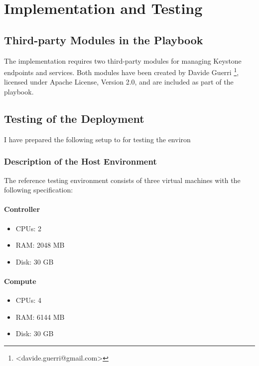 \chapter{Implementation and Testing}
\label{ch:testing}


\section{Third-party Modules in the Playbook}

The implementation requires two third-party modules for managing Keystone endpoints and services. Both modules have been created by Davide Guerri \footnote{<davide.guerri@gmail.com>}, licensed under Apache License, Version 2.0, and are included as part of the playbook.

\section{Testing of the Deployment}

I have prepared the following setup to for testing the environ
\subsection{Description of the Host Environment}

The reference testing environment consists of three virtual machines with the following specification:

\subsubsection*{Controller}

\begin{itemize}
  \item{CPUs: 2}
  \item{RAM: 2048 MB}
  \item{Disk: 30 GB}
\end{itemize}

\subsubsection*{Compute}

\begin{itemize}
  \item{CPUs: 4}
  \item{RAM: 6144 MB}
  \item{Disk: 30 GB}
\end{itemize}

